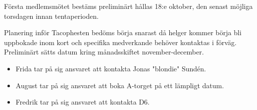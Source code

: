 \documentclass{protokoll}
\begin{document}
Första medlemsmötet bestäms preliminärt hållas 18:e oktober, den senast möjliga torsdagen innan tentaperioden.


Planering inför Tacophesten bedöms börja snarast då helger kommer börja bli uppbokade inom kort och specifika medverkande behöver kontaktas i förväg.
Preliminärt sätts datum kring månadsskiftet november-december.
\begin{itemize}
	\item Frida tar på sig ansvaret att kontakta Jonas "blondie" Sundén. 
	\item August tar på sig ansvaret att boka A-torget på ett lämpligt datum. 
	\item Fredrik tar på sig ansvaret att kontakta D6.
\end{itemize}
\end{document}
